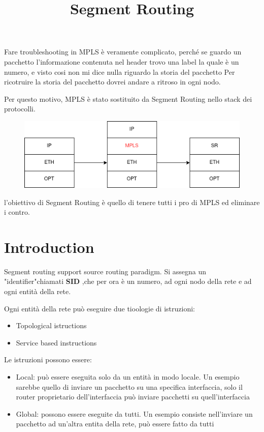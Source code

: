 \documentclass[12pt]{article}
\title{\textbf{Segment Routing}}
\author{}
\date{}
\begin{document}
\maketitle

Fare troubleshooting in MPLS è veramente complicato, perché se guardo un pacchetto l'informazione 
contenuta nel header trovo una label la quale è un numero, e visto cosi non mi dice nulla riguardo la storia del pacchetto
Per ricotruire la storia del pacchetto dovrei andare a ritroso in ogni nodo. 

Per questo motivo, MPLS è stato sostituito da Segment Routing nello stack dei protocolli. 


\begin{figure}[h]
    \includegraphics*[scale = 0.5]{F1.png}
    \centering
\end{figure}

l'obiettivo di Segment Routing è quello di tenere tutti i pro di MPLS ed eliminare i contro. 

\section{Introduction}

Segment routing support source routing paradigm. Si assegna un "identifier"chiamati {\bf{SID}} ,che per ora è un numero,
ad ogni nodo della rete e ad ogni entità della rete.   

Ogni entità della rete può eseguire due tioologie di istruzioni:
\begin{itemize}
    \item Topological istructions
    \item Service based instructions
\end{itemize}

Le istruzioni possono essere:
\begin{itemize}
    \item Local: può essere eseguita solo da un entità in modo locale. Un esempio sarebbe quello di inviare un pacchetto su una specifica interfaccia, solo il router proprietario dell'interfaccia
    può inviare pacchetti su quell'interfaccia
    \item Global: possono essere eseguite da tutti. Un esempio consiste nell'inviare un pacchetto ad un'altra entita
    della rete, può essere fatto da tutti 
\end{itemize}
\end{document}
